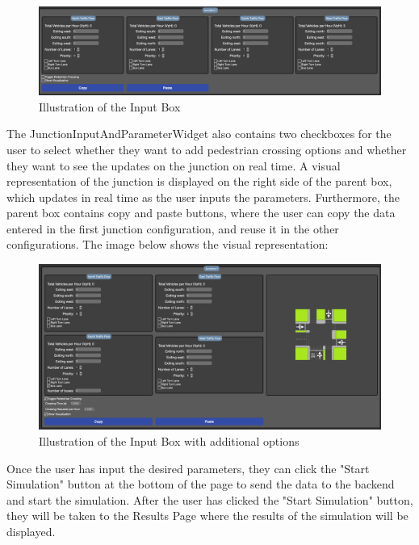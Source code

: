 \documentclass{article}
\begin{document}
    \begin{figure}[h!]
        \centering
        \includegraphics[width=\textwidth]{parameter}
        \caption{Illustration of the Input Box}
        \label{fig:parameter}
    \end{figure}

    The JunctionInputAndParameterWidget also contains two checkboxes for the user to select whether they want to add pedestrian crossing options and whether they want to see the updates on the junction on real time. A visual representation of the
    junction is displayed on the right side of the parent box, which updates in real time as the user inputs the parameters. Furthermore, the parent box contains copy and paste buttons, where the user can copy the data entered
    in the first junction configuration, and reuse it in the other configurations. The image below shows the visual representation:

    \begin{figure}[H]
        \centering
        \includegraphics[width=\textwidth]{inputExtra}
        \caption{Illustration of the Input Box with additional options}
        \label{fig:inputExtra}
    \end{figure}

    Once the user has input the desired parameters, they can click the "Start Simulation" button at the bottom of the page to send the data to the backend and start the simulation. After the user has clicked the "Start Simulation" button, they
    will be taken to the Results Page where the results of the simulation will be displayed.
\end{document}

